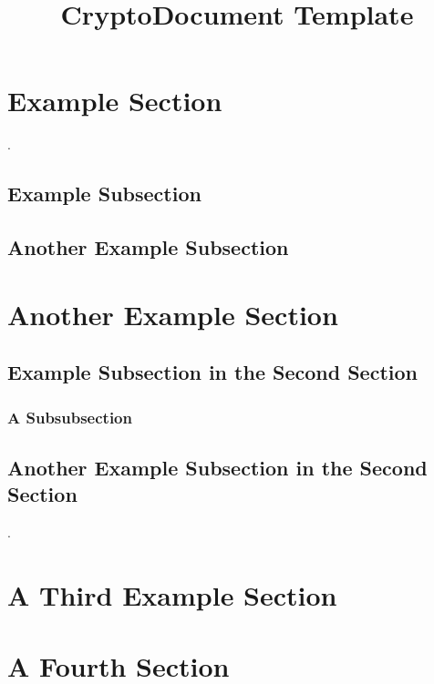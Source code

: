 \documentclass[eprint]{cryptodocument}
\title{CryptoDocument Template}
\begin{document}
\maketitle

\begin{abstract}
    \blindtext
\end{abstract}

\tableofcontents

\section{Example Section}
\blindtext \cite{einstein}.

\subsection{Example Subsection}
\blindtext

\subsection{Another Example Subsection}
\blindtext

\section{Another Example Section}

\blindtext

\subsection{Example Subsection in the Second Section}
\blindtext

\subsubsection{A Subsubsection}
\blindtext

\subsection{Another Example Subsection in the Second Section}
\blindtext \cite{dirac}.

\section{A Third Example Section}

\blindtext

\section{A Fourth Section}
\end{document}

